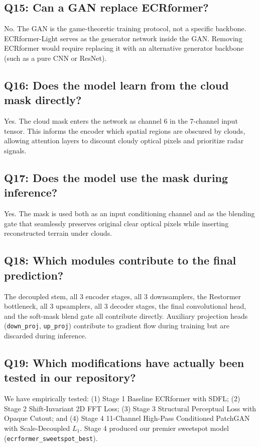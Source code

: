 \subsection*{Q15: Can a GAN replace ECRformer?}
No. The GAN is the game-theoretic training protocol, not a specific backbone. ECRformer-Light serves as the generator network inside the GAN. Removing ECRformer would require replacing it with an alternative generator backbone (such as a pure CNN or ResNet).

\subsection*{Q16: Does the model learn from the cloud mask directly?}
Yes. The cloud mask enters the network as channel 6 in the 7-channel input tensor. This informs the encoder which spatial regions are obscured by clouds, allowing attention layers to discount cloudy optical pixels and prioritize radar signals.

\subsection*{Q17: Does the model use the mask during inference?}
Yes. The mask is used both as an input conditioning channel and as the blending gate that seamlessly preserves original clear optical pixels while inserting reconstructed terrain under clouds.

\subsection*{Q18: Which modules contribute to the final prediction?}
The decoupled stem, all 3 encoder stages, all 3 downsamplers, the Restormer bottleneck, all 3 upsamplers, all 3 decoder stages, the final convolutional head, and the soft-mask blend gate all contribute directly. Auxiliary projection heads (\texttt{down\_proj}, \texttt{up\_proj}) contribute to gradient flow during training but are discarded during inference.

\subsection*{Q19: Which modifications have actually been tested in our repository?}
We have empirically tested: (1) Stage 1 Baseline ECRformer with SDFL; (2) Stage 2 Shift-Invariant 2D FFT Loss; (3) Stage 3 Structural Perceptual Loss with Opaque Cutout; and (4) Stage 4 11-Channel High-Pass Conditioned PatchGAN with Scale-Decoupled $L_1$. Stage 4 produced our premier sweetspot model (\texttt{ecrformer\_sweetspot\_best}).

